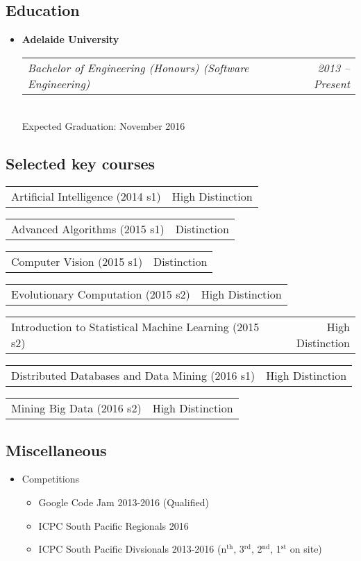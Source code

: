 \documentclass[10pt,letterpaper]{article}
\makeatletter
\newcommand{\headerrow}[2]
{\begin{tabular*}{\linewidth}{l@{\extracolsep{\fill}}r}
  #1 &
  #2 \\
\end{tabular*}}
\makeatother
\begin{document}
  \subsection*{Education}
  \begin{itemize}
    \parskip=0.1em

    \item
    {\textbf{Adelaide University}}
    \\
    \headerrow
      {\emph{Bachelor of Engineering (Honours) (Software Engineering)}}
      {\emph{2013 -- Present}}
    \\
    Expected Graduation: November 2016

  \end{itemize}
  \subsection*{Selected key courses}
  \begin{itemize*}
    \item \headerrow
      {Artificial Intelligence (2014 s1)}
      {High Distinction}
    \item \headerrow
      {Advanced Algorithms (2015 s1)}
      {Distinction}
    \item \headerrow
      {Computer Vision (2015 s1)}
      {Distinction}
    \item \headerrow
      {Evolutionary Computation (2015 s2)}
      {High Distinction}
    \item \headerrow
      {Introduction to Statistical Machine Learning (2015 s2)}
      {High Distinction}
    \item \headerrow
      {Distributed Databases and Data Mining (2016 s1)}
      {High Distinction}
    \item \headerrow
      {Mining Big Data (2016 s2)}
      {High Distinction}
  \end{itemize*}
  \subsection*{Miscellaneous}
  \begin{itemize}
    \item Competitions
      \begin{itemize}
        \item Google Code Jam 2013-2016 (Qualified)
        \item ICPC South Pacific Regionals 2016
        \item ICPC South Pacific Divsionals 2013-2016 (n$^\textrm{th}$, 3$^\textrm{rd}$, 2$^\textrm{nd}$, 1$^\textrm{st}$ on site)
      \end{itemize}
  \end{itemize}
\end{document}

